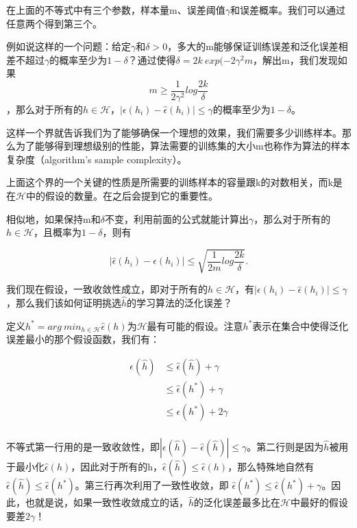 \documentclass[UTF8]{ctexart}
\begin{document}
在上面的不等式中有三个参数，样本量m、误差阈值$\gamma$和误差概率。我们可以通过任意两个得到第三个。

例如说这样的一个问题：给定$\gamma$和$\delta>0$，多大的m能够保证训练误差和泛化误差相差不超过$\gamma$的概率至少为$1-\delta$？通过使得$\delta =2k\ exp(-2\gamma^{2}m $，解出m，我们发现如果\[ m \geq \frac{1}{2\gamma^{2}}log\frac{2k}{\delta} \]，那么对于所有的$h\in \mathcal{H}$，$|\epsilon(h_{i})-\hat{\epsilon}(h_{i})| \leq \gamma $的概率至少为$1-\delta$。

这样一个界就告诉我们为了能够确保一个理想的效果，我们需要多少训练样本。那么为了能够得到理想级别的性能，算法需要的训练集的大小m也称作为算法的样本复杂度（algorithm’s sample complexity）。

上面这个界的一个关键的性质是所需要的训练样本的容量跟k的对数相关，而k是在$\mathcal{H}$中的假设的数量。在之后会提到它的重要性。



相似地，如果保持m和$\delta$不变，利用前面的公式就能计算出$\gamma$，那么对于所有的$h\in \mathcal{H}$，且概率为$1-\delta$，则有 

\[ |\hat{\epsilon}(h_{i})-\epsilon(h_{i})| \leq \sqrt{\frac{1}{2m}log\frac{2k}{\delta}}. \]


我们现在假设，一致收敛性成立，即对于所有的$h\in \mathcal{H}$，有$|\epsilon(h_{i})-\hat{\epsilon}(h_{i})| \leq \gamma$，那么我们该如何证明挑选$\hat{h}$的学习算法的泛化误差？

定义$h^{*}=arg\ min_{h\in \mathcal{H}}\hat{\epsilon}(h)$为$\mathcal{H}$最有可能的假设。注意$h^{*}$表示在集合中使得泛化误差最小的那个假设函数，我们有：

\begin{align*}
\epsilon(\hat{h}) & \leq \hat{\epsilon}(\hat{h}) + \gamma \\
& \leq \hat{\epsilon}(h^{*}) + \gamma \\
& \leq \epsilon(h^{*}) + 2\gamma \\
\end{align*}

不等式第一行用的是一致收敛性，即$|\epsilon(\hat{h})-\hat{\epsilon}(\hat{h})|\leq \gamma$。第二行则是因为$\hat{h}$被用于最小化$\hat{\epsilon}(h)$，因此对于所有的h，$\hat{\epsilon}(\hat{h})\leq \hat{\epsilon}(h)$，那么特殊地自然有$\hat{\epsilon}(\hat{h})\leq \hat{\epsilon}(h^{*})$。第三行再次利用了一致性收敛，即 $\hat{\epsilon}(h^{*}) \leq \hat{\epsilon}(h^{*}) + \gamma $。因此，也就是说，如果一致性收敛成立的话，$\hat{h}$的泛化误差最多比在$\mathcal{H}$中最好的假设要差$2\gamma$！
\end{document}
